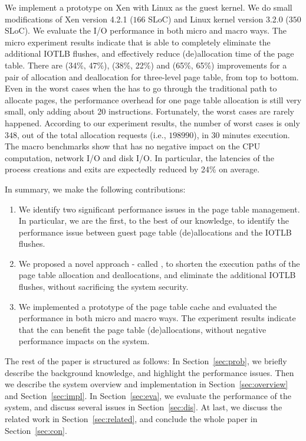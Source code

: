 We implement a prototype on Xen with Linux as the guest kernel. We do small modifications of Xen version 4.2.1 ($166$ SLoC) and Linux kernel version 3.2.0 ($350$ SLoC).
We evaluate the I/O performance in both micro and macro ways.
The micro experiment results indicate that \name is able to completely eliminate the additional IOTLB flushes, and effectively reduce (de)allocation time of the page table.
There are (34\%, 47\%), (38\%, 22\%) and (65\%, 65\%) improvements for a pair of allocation and deallocation for three-level page table, from top to bottom.
Even in the worst cases when the \name has to go through the traditional path to allocate pages, the performance overhead for one page table allocation is still very small, only adding about 20 instructions. Fortunately, the worst cases are rarely happened. According to our experiment results, the number of worst cases is only $348$, out of the total allocation requests (i.e., $198990$), in 30 minutes execution.
The macro benchmarks show that \name has no negative impact on the CPU computation, network I/O and disk I/O.
In particular, the latencies of the process creations and exits are expectedly reduced by 24\% on average.

In summary, we make the following contributions:
\begin{enumerate}
\item We identify two significant performance issues in the page table management. In particular, we are the first, to the best of our knowledge, to identify the performance issue between guest page table (de)allocations and the IOTLB flushes.
\item We proposed a novel approach - called \name, to shorten the execution paths of the page table allocation and deallocations, and eliminate the additional IOTLB flushes, without sacrificing the system security.
\item We implemented a prototype of the page table cache and evaluated the performance in both micro and macro ways. The experiment results indicate that the \name can benefit the page table (de)allocations, without negative performance impacts on the system.
\end{enumerate}

The rest of the paper is structured as follows: In Section~\ref{sec:prob}, we briefly describe the background knowledge, and highlight the performance issues. Then we describe the system overview and implementation in Section~\ref{sec:overview} and Section~\ref{sec:impl}. In Section~\ref{sec:eva}, we evaluate the performance of the \name system, and discuss several issues in Section~\ref{sec:dis}. At last, we discuss the related work in Section~\ref{sec:related}, and conclude the whole paper in Section~\ref{sec:con}.

